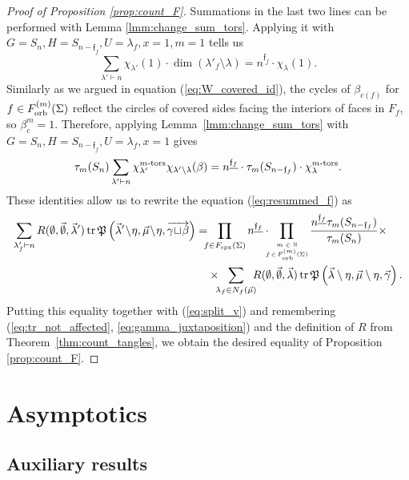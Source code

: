 \documentclass{amsart}
\newcommand{\Fspx}{F_{\textnormal{spx}}}
\newcommand{\Forb}[1][m]{F^{(#1)}_{\textnormal{orb}}}
\newcommand{\iterorb}{{\tiny\begin{matrix}m\in\mathbb{N}\\f\!\in\!\Forb(\Sigma)\end{matrix}}}
\newcommand{\tn}{\textnormal}
\newcommand{\tr}{\operatorname{tr}}
\begin{document}
\begin{proof}[Proof of Proposition \ref{prop:count_F}]
Summations in the last two lines can be performed with Lemma \ref{lmm:change_sum_tors}. Applying it with $G=S_n,H=S_{n-\mathfrak{f}_f},U=\lambda_f,x=1,m=1$ tells us
\begin{equation*}
\sum_{\lambda'\vdash n}\chi_{\lambda'}(1)\cdot\dim(\lambda'_f\setminus\lambda)=n^{\underline{\mathfrak{f}_f}}\cdot\chi_\lambda(1).
\end{equation*}
Similarly as we argued in equation (\ref{eq:W_covered_id}), the cycles of $\beta_{c(f)}$ for $f\in\Forb(\Sigma)$ reflect the circles of covered sides facing the interiors of faces in $F_f$, so $\beta_c^m=1$. Therefore, applying Lemma~\ref{lmm:change_sum_tors} with $G=S_n,H=S_{n-\mathfrak{f}_f},U=\lambda_f,x=1$ gives
\begin{equation*}
\tau_m(S_n)\sum_{\lambda'\vdash n}\chi_{\lambda'}^{m\tn{-tors}}\chi_{\lambda'\setminus\lambda}(\beta)=n^{\underline{\mathfrak{f}_f}}\cdot\tau_m(S_{n-\mathfrak{f}_f})\cdot\chi_\lambda^{m\tn{-tors}}.
\end{equation*}
These identities allow us to rewrite the equation (\ref{eq:resummed_f}) as
\begin{align*}
\sum_{\lambda'_f\vdash n}R(\emptyset,\vec\emptyset,\vec\lambda')\tr\mathfrak{P}\left(\vec\lambda'\!\setminus\!\eta,\vec\mu\!\setminus\!\eta,\overrightarrow{\gamma\!\sqcup\!\beta}\right)=&\hspace*{-5pt}\prod_{f\in\Fspx(\Sigma)}n^{\underline{\mathfrak{f}_f}}\cdot\hspace*{-5pt}\prod_\iterorb\frac{n^{\underline{\mathfrak{f}_f}}\tau_m(S_{n-\mathfrak{f}_f})}{\tau_m(S_n)}\times\\
&\times\hspace*{-5pt}\sum_{\lambda_f\in N_f(\vec\mu)}\hspace*{-5pt}R(\emptyset,\vec\emptyset,\vec\lambda)\tr\mathfrak{P}\left(\vec\lambda\setminus\eta,\vec\mu\setminus\eta,\vec\gamma\right).
\end{align*}
Putting this equality together with (\ref{eq:split_v}) and remembering (\ref{eq:tr_not_affected}, \ref{eq:gamma_juxtaposition}) and the definition of $R$ from Theorem~\ref{thm:count_tangles}, we obtain the desired equality of Proposition \ref{prop:count_F}.
\end{proof}

\section{Asymptotics}\label{sec:asymptotics}

\subsection{Auxiliary results}
\end{document}
